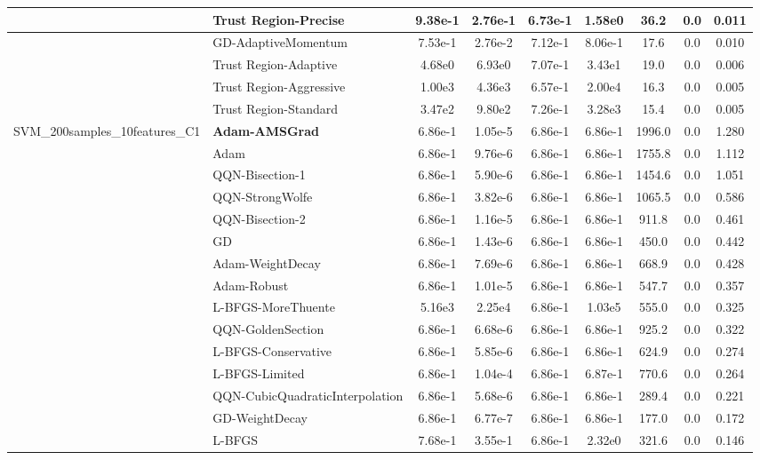 \documentclass[10pt]{article}
\begin{document}
\begin{longtable}{|l|l|c|c|c|c|c|c|c|}
\hline
 & Trust Region-Precise & 9.38e-1 & 2.76e-1 & 6.73e-1 & 1.58e0 & 36.2 & 0.0 & 0.011 \\
\hline
 & GD-AdaptiveMomentum & 7.53e-1 & 2.76e-2 & 7.12e-1 & 8.06e-1 & 17.6 & 0.0 & 0.010 \\
\hline
 & Trust Region-Adaptive & 4.68e0 & 6.93e0 & 7.07e-1 & 3.43e1 & 19.0 & 0.0 & 0.006 \\
\hline
 & Trust Region-Aggressive & 1.00e3 & 4.36e3 & 6.57e-1 & 2.00e4 & 16.3 & 0.0 & 0.005 \\
\hline
 & Trust Region-Standard & 3.47e2 & 9.80e2 & 7.26e-1 & 3.28e3 & 15.4 & 0.0 & 0.005 \\
SVM\_200samples\_10features\_C1 & \textbf{Adam-AMSGrad} & 6.86e-1 & 1.05e-5 & 6.86e-1 & 6.86e-1 & 1996.0 & 0.0 & 1.280 \\
\hline
 & Adam & 6.86e-1 & 9.76e-6 & 6.86e-1 & 6.86e-1 & 1755.8 & 0.0 & 1.112 \\
\hline
 & QQN-Bisection-1 & 6.86e-1 & 5.90e-6 & 6.86e-1 & 6.86e-1 & 1454.6 & 0.0 & 1.051 \\
\hline
 & QQN-StrongWolfe & 6.86e-1 & 3.82e-6 & 6.86e-1 & 6.86e-1 & 1065.5 & 0.0 & 0.586 \\
\hline
 & QQN-Bisection-2 & 6.86e-1 & 1.16e-5 & 6.86e-1 & 6.86e-1 & 911.8 & 0.0 & 0.461 \\
\hline
 & GD & 6.86e-1 & 1.43e-6 & 6.86e-1 & 6.86e-1 & 450.0 & 0.0 & 0.442 \\
\hline
 & Adam-WeightDecay & 6.86e-1 & 7.69e-6 & 6.86e-1 & 6.86e-1 & 668.9 & 0.0 & 0.428 \\
\hline
 & Adam-Robust & 6.86e-1 & 1.01e-5 & 6.86e-1 & 6.86e-1 & 547.7 & 0.0 & 0.357 \\
\hline
 & L-BFGS-MoreThuente & 5.16e3 & 2.25e4 & 6.86e-1 & 1.03e5 & 555.0 & 0.0 & 0.325 \\
\hline
 & QQN-GoldenSection & 6.86e-1 & 6.68e-6 & 6.86e-1 & 6.86e-1 & 925.2 & 0.0 & 0.322 \\
\hline
 & L-BFGS-Conservative & 6.86e-1 & 5.85e-6 & 6.86e-1 & 6.86e-1 & 624.9 & 0.0 & 0.274 \\
\hline
 & L-BFGS-Limited & 6.86e-1 & 1.04e-4 & 6.86e-1 & 6.87e-1 & 770.6 & 0.0 & 0.264 \\
\hline
 & QQN-CubicQuadraticInterpolation & 6.86e-1 & 5.68e-6 & 6.86e-1 & 6.86e-1 & 289.4 & 0.0 & 0.221 \\
\hline
 & GD-WeightDecay & 6.86e-1 & 6.77e-7 & 6.86e-1 & 6.86e-1 & 177.0 & 0.0 & 0.172 \\
\hline
 & L-BFGS & 7.68e-1 & 3.55e-1 & 6.86e-1 & 2.32e0 & 321.6 & 0.0 & 0.146 \\

\end{longtable}
\end{document}
